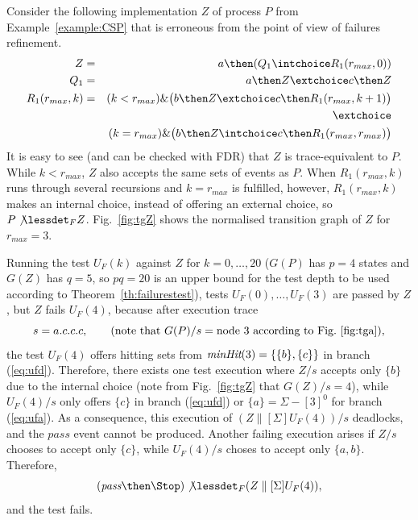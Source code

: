 \begin{example}
\label{ex:uf1tests} Consider the following implementation $Z$ of process $P$
from Example~\ref{example:CSP} that is erroneous from the point of view of
failures refinement.
\begin{eqnarray*}
Z & = & a \then (Q_1 \intchoice R_1(r_{max},0))
\\
Q_1 & = & a\then Z \extchoice c\then Z
\\
R_1(r_{max},k) & = & (k < r_{max}) \& \big(b\then Z \extchoice  c\then R_1(r_{max},k+1)\big)
\\ & & \extchoice
\\ & & (k = r_{max}) \& \big(b\then Z \intchoice c\then R_1(r_{max},r_{max})\big)
\end{eqnarray*}
It is easy to see (and can be checked with FDR) that $Z$ is trace-equivalent
to $P$. While $k < r_{max}$, $Z$ also accepts the same sets of events as $P$.
When $R_1(r_{max},k)$ runs through several recursions and $k = r_{max}$ is
fulfilled, however, $R_1(r_{max},k)$ makes an internal choice, instead of
offering an external choice, so $P\not\lessdet_F Z$.
Fig.~\ref{fig:tgZ} shows the normalised transition graph of $Z$ for $r_{max}
= 3$.



Running the test $U_F(k)$ against $Z$ for $k=0,\dots,20$ ($G(P)$ has $p =
4$ states and $G(Z)$ has $q=5$, so $pq=20$ is an upper bound for the test
depth to be used according to Theorem~\ref{th:failurestest}), tests
$U_F(0),\dots, U_F(3)$ are passed by $Z$, but $Z$ fails $U_F(4)$,
because after  execution trace
\[
s = a.c.c.c, \qquad\text{(note that $G(P)/s = \text{node}\ 3$ according to Fig.~\ref{fig:tga})},
\]
the test $U_F(4)$ offers hitting sets from $\text{\it minHit}(3) = \{\{b\},\{c\}\}$
in branch (\ref{eq:ufd}). Therefore,  there exists one test execution
where $Z/s$ accepts only $\{b\}$ due to the internal choice (note 
from Fig.~\ref{fig:tgZ} that
$G(Z)/s = 4$), while $U_F(4)/s$
only offers $\{c\}$ in branch (\ref{eq:ufd}) or $\{ a\} = \Sigma - [3]^0$ for 
branch (\ref{eq:ufa}).  As a consequence, this execution of 
$(Z\parallel[\Sigma] U_F(4))/s$ deadlocks, and the $pass$ event cannot be
produced. Another failing execution arises if $Z/s$ chooses to accept only
$\{c \}$, while $U_F(4)/s$ choses to accept only $\{a,b\}$. Therefore,
\[
(\epass\then \Stop)\not\lessdet_F  (Z\parallel[\Sigma] U_F(4)),
\]
and the test fails.
\xbox
\end{example}

